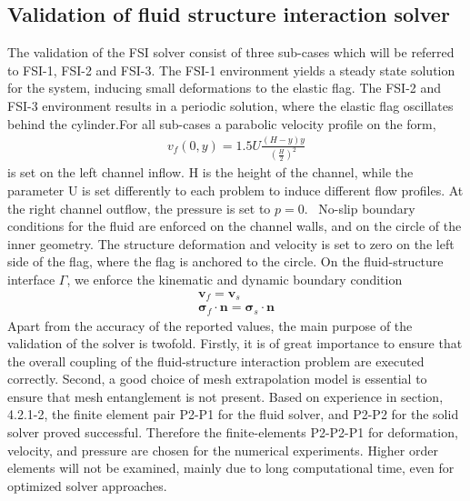 \subsection{Validation of fluid structure interaction solver}
The validation of the FSI solver consist of three sub-cases which will be referred to FSI-1, FSI-2 and FSI-3. The FSI-1 environment yields a steady state solution for the system, inducing small deformations to the elastic flag. The FSI-2 and FSI-3 environment results in a periodic solution, where the elastic flag oscillates behind the cylinder.For all sub-cases a parabolic velocity profile on the form,
\begin{align*}
v_f(0, y) = 1.5 U\frac{(H -y)y}{(\frac{H}{2})^2}
\end{align*}
is set on the left channel inflow. H is the height of the channel, while the parameter U is set differently to each problem to induce different flow profiles. At the right channel outflow, the pressure is set to $p = 0$. \
No-slip boundary conditions for the fluid are enforced on the channel walls, and on the circle of the inner geometry.
The structure deformation and velocity is set to zero on the left side of the flag, where the flag is anchored to the circle. On the fluid-structure interface $\Gamma$, we enforce the kinematic and dynamic boundary condition
\begin{align}
\mathbf{v}_f = \mathbf{v}_s \\
\mathbf{\sigma}_f \cdot \mathbf{n} = \mathbf{\sigma}_s \cdot \mathbf{n}
\end{align}
Apart from the accuracy of the reported values, the main purpose of the validation of the solver is twofold. Firstly, it is of great importance to ensure that the overall coupling of the fluid-structure interaction problem are executed correctly. Second, a good choice of mesh extrapolation model is essential to ensure that mesh entanglement is not present. Based on experience in section, 4.2.1-2, the finite element pair P2-P1 for the fluid solver, and P2-P2 for the solid solver proved successful. Therefore the finite-elements P2-P2-P1 for deformation, velocity, and pressure are chosen for the numerical experiments. Higher order elements will not be examined, mainly due to long computational time, even for optimized solver approaches.

\newpage

